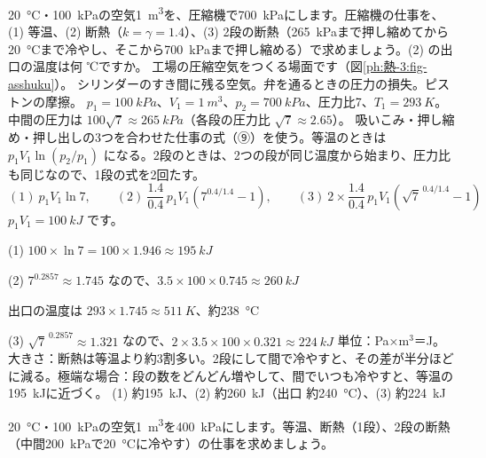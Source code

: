 \begin{phreidai}[圧縮機の仕事：等温・断熱・2段]
\label{ph:熱-3:ex11}\qty{20}{\celsius}・\qty{100}{kPa}の空気\qty{1}{m^3}を、圧縮機で\qty{700}{kPa}にします。圧縮機の仕事を、(1) 等温、(2) 断熱（$k=\gamma=1.4$）、(3) 2段の断熱（\qty{265}{kPa}まで押し縮めてから\qty{20}{\celsius}まで冷やし、そこから\qty{700}{kPa}まで押し縮める）で求めましょう。(2) の出口の温度は何 ℃ですか。
\phbamen
工場の圧縮空気をつくる場面です（図\ref{ph:熱-3:fig-asshuku}）。
\phmushi
シリンダーのすき間に残る空気。弁を通るときの圧力の損失。ピストンの摩擦。
\phzu
$p_1=\qty{100}{kPa}$、$V_1=\qty{1}{m^3}$、$p_2=\qty{700}{kPa}$、圧力比7、$T_1=\qty{293}{K}$。中間の圧力は $100\sqrt7\approx\qty{265}{kPa}$（各段の圧力比 $\sqrt7\approx2.65$）。
\phriyu
吸いこみ・押し縮め・押し出しの3つを合わせた仕事の式（⑨）を使う。等温のときは $p_1V_1\ln(p_2/p_1)$ になる。2段のときは、2つの段が同じ温度から始まり、圧力比も同じなので、1段の式を2回たす。
\phtateru
\[ (1)\ p_1V_1\ln7,\qquad (2)\ \frac{1.4}{0.4}\,p_1V_1(7^{0.4/1.4}-1),\qquad (3)\ 2\times\frac{1.4}{0.4}\,p_1V_1(\sqrt7^{\,0.4/1.4}-1) \]
\phtoku
$p_1V_1=\qty{100}{kJ}$ です。\par
(1) $100\times\ln7=100\times1.946\approx\qty{195}{kJ}$\par
(2) $7^{0.2857}\approx1.745$ なので、$3.5\times100\times0.745\approx\qty{260}{kJ}$\par
\phantom{(2)} 出口の温度は $293\times1.745\approx\qty{511}{K}$、約\qty{238}{\celsius}\par
(3) $\sqrt7^{\,0.2857}\approx1.321$ なので、$2\times3.5\times100\times0.321\approx\qty{224}{kJ}$
\phtashikame
単位：Pa×m$^3$＝J。大きさ：断熱は等温より約3割多い。2段にして間で冷やすと、その差が半分ほどに減る。極端な場合：段の数をどんどん増やして、間でいつも冷やすと、等温の\qty{195}{kJ}に近づく。
\kotae (1) 約\qty{195}{kJ}、(2) 約\qty{260}{kJ}（出口 約\qty{240}{\celsius}）、(3) 約\qty{224}{kJ}
\end{phreidai}
\begin{jibun}
\qty{20}{\celsius}・\qty{100}{kPa}の空気\qty{1}{m^3}を\qty{400}{kPa}にします。等温、断熱（1段）、2段の断熱（中間\qty{200}{kPa}で\qty{20}{\celsius}に冷やす）の仕事を求めましょう。
\end{jibun}


